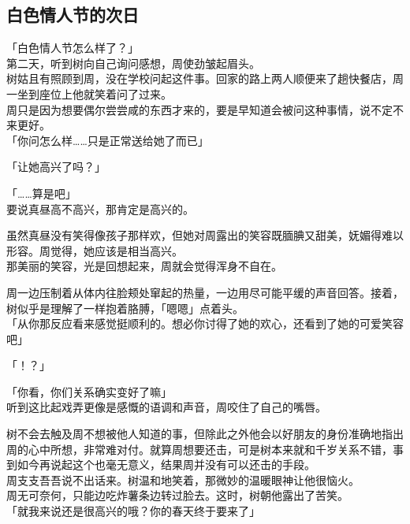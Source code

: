 \subsection{白色情人节的次日}

「白色情人节怎么样了？」\\

第二天，听到树向自己询问感想，周使劲皱起眉头。\\

树姑且有照顾到周，没在学校问起这件事。回家的路上两人顺便来了趟快餐店，周一坐到座位上他就笑着问了过来。\\

周只是因为想要偶尔尝尝咸的东西才来的，要是早知道会被问这种事情，说不定不来更好。\\

「你问怎么样……只是正常送给她了而已」

「让她高兴了吗？」

「……算是吧」\\

要说真昼高不高兴，那肯定是高兴的。

虽然真昼没有笑得像孩子那样欢，但她对周露出的笑容既腼腆又甜美，妩媚得难以形容。周觉得，她应该是相当高兴。\\

那美丽的笑容，光是回想起来，周就会觉得浑身不自在。

周一边压制着从体内往脸颊处窜起的热量，一边用尽可能平缓的声音回答。接着，树似乎是理解了一样抱着胳膊，「嗯嗯」点着头。\\

「从你那反应看来感觉挺顺利的。想必你讨得了她的欢心，还看到了她的可爱笑容吧」

「！？」

「你看，你们关系确实变好了嘛」\\

听到这比起戏弄更像是感慨的语调和声音，周咬住了自己的嘴唇。

树不会去触及周不想被他人知道的事，但除此之外他会以好朋友的身份准确地指出周的心中所想，非常难对付。就算周想要还击，可是树本来就和千岁关系不错，事到如今再说起这个也毫无意义，结果周并没有可以还击的手段。\\

周支支吾吾说不出话来。树温和地笑着，那微妙的温暖眼神让他很恼火。\\

周无可奈何，只能边吃炸薯条边转过脸去。这时，树朝他露出了苦笑。\\

「就我来说还是很高兴的哦？你的春天终于要来了」

